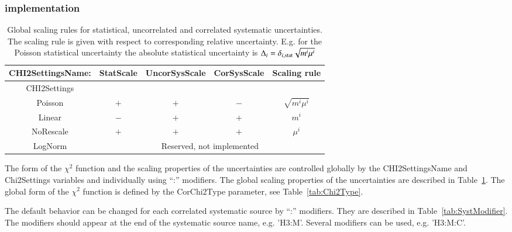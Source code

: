 \subsubsection{\fitter implementation}

\begin{table}
\begin{center}
\begin{tabular}{ccccc} 
\hline
{\sc CHI2SettingsName:}   & {\sc StatScale} & {\sc UncorSysScale} & {\sc CorSysScale} & Scaling rule \\
\hline
{\sc CHI2Settings}       &                 &                     &                   &              \\
\hline
  {\sc Poisson}   &  $+$  &  $+$  &  $-$  & $\sqrt{ m^i \mu^i}$ \\
  {\sc Linear}    & $-$   &  $+$  &  $+$  & $m^i$               \\
  {\sc NoRescale} & $+$   &  $+$  &  $+$  & $\mu^i$   \\
  {\sc LogNorm}   &  \multicolumn{4}{c}{Reserved, not implemented} \\
\hline
\end{tabular}
\end{center}
\caption{\label{tab:ErrScale}Global scaling rules for statistical, 
uncorrelated and correlated systematic uncertainties. The scaling
rule is given with respect to corresponding relative uncertainty.
E.g. for the {\sc Poisson} statistical uncertainty the absolute statistical
uncertainty is $\Delta_i = \delta_{i, {\rm stat}}\sqrt{m^i\mu^i}$   }
\end{table}

The form of the $\chi^2$ function and the scaling properties of the 
uncertainties are controlled globally by the {\sc CHI2SettingsName} and
{\sc  Chi2Settings} variables and individually using {\sc ``:''} modifiers.
The global scaling properties of the uncertainties are described in 
Table~\ref{tab:ErrScale}. The global form of the $\chi^2$ function
is defined by the {\sc CorChi2Type} parameter, see   
Table~\ref{tab:Chi2Type}.

The default behavior can be changed for each correlated systematic source by ``:'' modifiers.
They are described in Table~\ref{tab:SystModifier}. The modifiers should appear at the end 
of the systematic source name, e.g. {\sc 'H3:M'}. Several modifiers can be used, e.g. {\sc 'H3:M:C'}.

